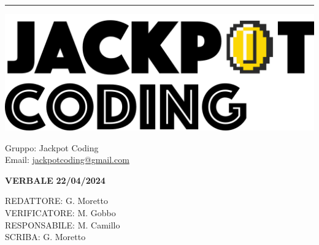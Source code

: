 \documentclass[5pt]{article}
\begin{document}
\hrule
\begin{minipage}[t]{0.50\textwidth}
    \begin{flushleft}
        \hspace{10pt}
        \includegraphics[scale=0.65]{jackpot-logo.png} 
    \end{flushleft}
\end{minipage}
\hspace{-60pt} %
\begin{flushright}
    \begin{minipage}[t]{0.50\textwidth}
        \begin{flushright}
            Gruppo: {\Large Jackpot Coding}\\
            Email: \href{mailto:jackpotcoding@gmail.com}{jackpotcoding@gmail.com}
        \end{flushright}
    \end{minipage}
\end{flushright}

\vspace{15pt}

\begin{center}
    \textbf{\large VERBALE }
    \textbf{\large 22/04/2024} \\
    \textbf{\Large}
\end{center}

\vspace{13pt}

\begin{flushleft}
    \begin{spacing}{1.5}
        REDATTORE:  G. Moretto\\
        VERIFICATORE: M. Gobbo\\%
        RESPONSABILE: M. Camillo\\%
        \vspace{7pt}
        SCRIBA: G. Moretto\\%
    \end{spacing}
\end{flushleft}
\end{document}
